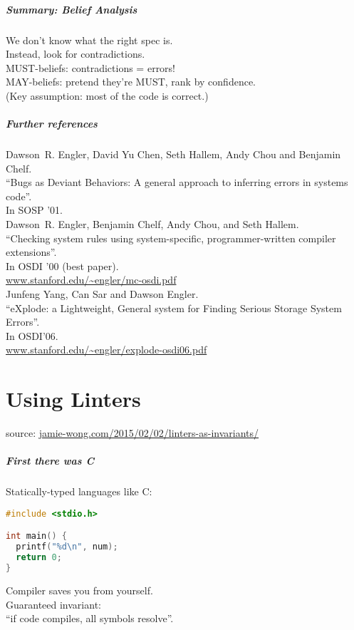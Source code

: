 \documentclass{beamer}
\newenvironment{changemargin}[1]{%
  \begin{list}{}{%
    \setlength{\topsep}{0pt}%
    \setlength{\leftmargin}{#1}%
    \setlength{\rightmargin}{1em}
    \setlength{\listparindent}{\parindent}%
    \setlength{\itemindent}{\parindent}%
    \setlength{\parsep}{\parskip}%
  }%
  \item[]}{\end{list}}
\begin{document}
\begin{frame}
  \frametitle{Summary: Belief Analysis}
    \begin{changemargin}{2cm}
      We don't know what the right spec is.\\
      Instead, look for contradictions.\\[2em]
      MUST-beliefs: contradictions = errors!\\[1em]
      MAY-beliefs: pretend they're MUST, rank by confidence.\\[2em]
      (Key assumption: most of the code is correct.)
    \end{changemargin}
\end{frame}

\begin{frame}
  \frametitle{Further references}

Dawson~R. Engler, David Yu Chen, Seth Hallem, Andy Chou and Benjamin Chelf.\\
``Bugs as Deviant Behaviors: A general approach to inferring errors in systems code''.\\
In SOSP '01.\\[1em]

Dawson~R. Engler, Benjamin Chelf, Andy Chou, and Seth Hallem.\\
``Checking system rules using system-specific, programmer-written
  compiler extensions''.\\
In OSDI '00 (best paper).\\
\url{www.stanford.edu/~engler/mc-osdi.pdf}\\[1em]

Junfeng Yang, Can Sar and Dawson Engler.\\
``eXplode: a Lightweight, General system for Finding Serious Storage System Errors''.\\
In OSDI'06.\\
\url{www.stanford.edu/~engler/explode-osdi06.pdf}
\end{frame}

\part{Using Linters}

\begin{frame}
\partpage
\small
source: \url{jamie-wong.com/2015/02/02/linters-as-invariants/}
\end{frame}

\begin{frame}[fragile]
\frametitle{First there was C}
\begin{changemargin}{2cm}
Statically-typed languages like C:
\begin{lstlisting}[language=C]
#include <stdio.h>

int main() {
  printf("%d\n", num);
  return 0;
}
\end{lstlisting}
Compiler saves you from yourself.\\[1em]
Guaranteed invariant:\\
\hspace*{2em} ``if code compiles, all symbols resolve''.
\end{changemargin}
\end{frame}
\end{document}
